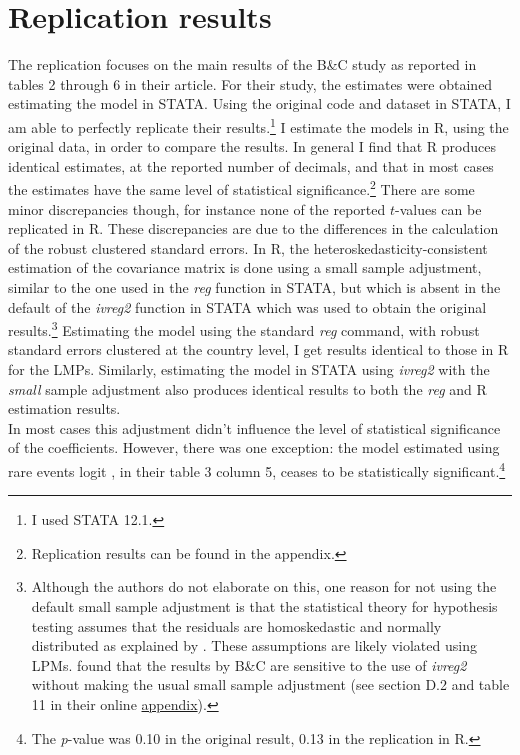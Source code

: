 \documentclass[a4paper,11pt]{article}
\begin{document}
\section{Replication results}
The replication focuses on the main results of the B\&C study as reported in tables 2 through 6 in their article. 
For their study, the estimates were obtained estimating the model in STATA. 
Using the original code and dataset in STATA, I am able to perfectly replicate their results.\footnote{I used STATA 12.1.} 
I estimate the models in R, using the original data, in order to compare the results. 
In general I find that R produces identical estimates, at the reported number of decimals, and that in most cases the estimates have the same level of statistical significance.\footnote{Replication results can be found in the appendix.} 
There are some minor discrepancies though, for instance none of the reported $t$-values can be replicated in R.
These discrepancies are due to the differences in the calculation of the robust clustered standard errors.
In R, the heteroskedasticity-consistent estimation of the covariance matrix is done using a small sample adjustment, similar to the one used in the \textit{reg} function in STATA, but which is absent in the default of the \textit{ivreg2} function in STATA which was used to obtain the original results.\footnote{Although the authors do not elaborate on this, one reason for not using the default small sample adjustment is that the statistical theory for hypothesis testing assumes that the residuals are homoskedastic and normally distributed as explained by \citet{Ciccone2011}. These assumptions are likely violated using LPMs. \citet{Bazzi2014} found that the results by B\&C are sensitive to the use of \textit{ivreg2} without making the usual small sample adjustment (see section D.2 and table 11 in their online \href{https://www.aeaweb.org/aej/mac/app/0604/2013-0226_app.pdf}{appendix}).}
Estimating the model using the standard \textit{reg} command, with robust standard errors clustered at the country level, I get results identical to those in R for the LMPs.
Similarly, estimating the model in STATA using \textit{ivreg2} with the \textit{small} sample adjustment also produces identical results to both the \textit{reg} and R estimation results.\\
In most cases this adjustment didn't influence the level of statistical significance of the coefficients. 
However, there was one exception: the model estimated using rare events logit \citep{King2001}, in their table 3 column 5, ceases to be statistically significant.\footnote{The \textit{p}-value was 0.10 in the original result, 0.13 in the replication in R.}\\
\end{document}
